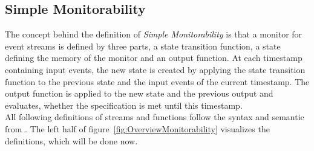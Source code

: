 	\subsection{Simple Monitorability}
		The concept behind the definition of \textit{Simple Monitorability} is that a monitor for event streams is defined by three parts, a state transition function, a state defining the memory of the monitor and an output function. At each timestamp containing input events, the new state is created by applying the state transition function to the previous state and the input events of the current timestamp. The output function is applied to the new state and the previous output and evaluates, whether the specification is met until this timestamp.\\
		All following definitions of streams and functions follow the syntax and semantic from \cite{TeSSLa2}. The left half of figure~\ref{fig:OverviewMonitorability} visualizes the definitions, which will be done now.
